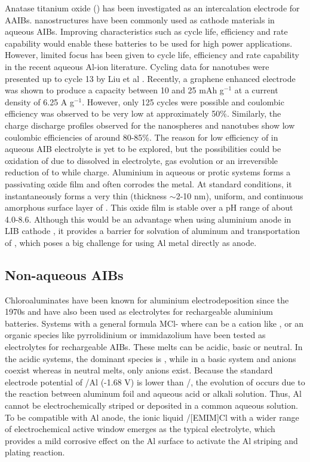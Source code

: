 Anatase titanium oxide () has been investigated as an intercalation electrode for AAIBs.  nanostructures have been commonly used as cathode materials in aqueous AIBs. Improving characteristics such as cycle life, efficiency and rate capability would enable these batteries to be used for high power applications. However, limited focus has been given to cycle life, efficiency and rate capability in the recent aqueous Al-ion literature. Cycling data for  nanotubes were presented up to cycle 13 by Liu et al \cite{liu_aluminum_2012}.  Recently, a graphene enhanced  electrode was shown to produce a capacity between 10 and 25 mAh g$^{-1}$ at a current density of 6.25 A g$^{-1}$. However, only 125 cycles were possible and coulombic efficiency was observed to be very low at approximately 50\%. Similarly, the charge discharge profiles observed for the nanospheres and nanotubes show low coulombic efficiencies of around 80-85\%. The reason for low efficiency of  in aqueous AIB electrolyte is yet to be explored, but the possibilities could be oxidation of  due to dissolved  in electrolyte,  gas evolution or an irreversible reduction of  to  while charge.  
Aluminium in aqueous or protic systems forms a passivating oxide film and often corrodes the metal. At standard conditions, it instantaneously forms a very thin (thickness $\sim$2-10 nm), uniform, and continuous amorphous surface layer of  \cite{vargel2004translated}. This oxide film is stable over a pH range of about 4.0-8.6. Although this would be an advantage when using aluminium anode in LIB cathode \cite{myung_electrochemical_2011}, it provides a barrier for solvation of aluminum and transportation of , which poses a big challenge for using Al metal directly as anode.

\subsection{Non-aqueous AIBs}
Chloroaluminates have been known for aluminium electrodeposition since the 1970s and have also been used as electrolytes for rechargeable aluminium batteries. Systems with a general formula MCl- where  can be a cation like ,  or an organic species like pyrrolidinium or immidazolium have been tested as electrolytes for rechargeable AIBs. These melts can be acidic, basic or neutral. In the acidic systems, the dominant species is , while in a basic system  and  anions coexist whereas in neutral melts, only  anions exist. Because the standard electrode potential of /Al (-1.68 V) is lower than /, the evolution of  occurs due to the reaction between aluminum foil and aqueous acid or alkali solution. Thus, Al cannot be electrochemically striped or deposited in a common aqueous solution. To be compatible with Al anode, the ionic liquid /[EMIM]Cl with a wider range of electrochemical active window emerges as the typical electrolyte, which provides a mild corrosive effect on the Al surface to activate the Al striping and plating reaction. 

